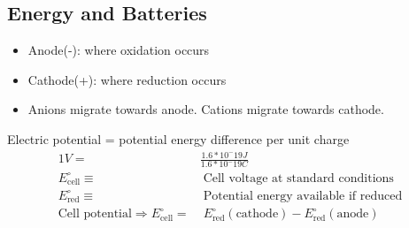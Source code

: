 \subsection{Energy and Batteries}
    \begin{itemize}
        \item Anode(-): where oxidation occurs
        \item Cathode(+): where reduction occurs
        \item Anions migrate towards anode. Cations migrate towards cathode.
    \end{itemize}

    Electric potential = potential energy difference per unit charge
    \begin{align*}
        1V =& \frac{1.6*10^-19 J}{1.6*10^-19 C}\\
        E^\circ_\text{cell} \equiv& \; \text{Cell voltage at standard conditions}\\
        E^\circ_\text{red} \equiv& \; \text{Potential energy available if reduced}\\
        \text{Cell potential} \Rightarrow E^\circ_\text{cell} =& \; E^\circ_\text{red}(\text{cathode}) - E^\circ_\text{red}(\text{anode})
    \end{align*}